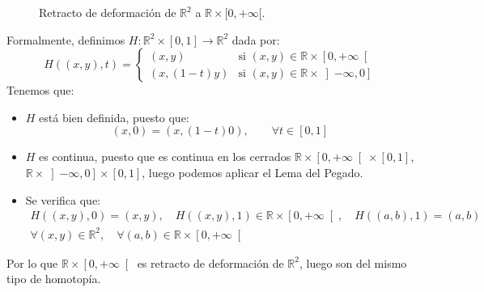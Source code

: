 \begin{ejercicio}
\begin{figure}[ht]
            \caption{Retracto de deformación de $\mathbb{R}^2$ a $\mathbb{R}\times [0,+\infty[$.}
            \label{fig:2.1.14}
        \end{figure}
        \noindent
        Formalmente, definimos $H:\mathbb{R}^2\times [0,1]\to \mathbb{R}^2$ dada por:
            \begin{equation*}
                H((x,y),t) = \left\{\begin{array}{ll}
                        (x,y) & \text{si\ } (x,y)\in \mathbb{R}\times \left[0,+\infty\right[ \\
                        (x, (1-t)y) & \text{si\ } (x,y)\in \mathbb{R}\times \left]-\infty, 0\right]
                \end{array}\right. 
            \end{equation*}
            Tenemos que:
            \begin{itemize}
                \item $H$ está bien definida, puesto que:
                    \begin{equation*}
                        (x,0) = (x,(1-t)0), \qquad \forall t\in [0,1]
                    \end{equation*}
                \item $H$ es continua, puesto que es continua en los cerrados $\mathbb{R}\times \left[0,+\infty\right[\times [0,1]$, $\mathbb{R}\times \left]-\infty,0\right]\times [0,1]$, luego podemos aplicar el Lema del Pegado.
                \item Se verifica que:
                    \begin{multline*}
                        H((x,y),0) = (x,y), \quad H((x,y),1) \in \mathbb{R}\times \left[0,+\infty\right[, \quad H((a,b),1) = (a,b) \\
                            \forall (x,y)\in \mathbb{R}^2, \quad \forall (a,b)\in \mathbb{R}\times \left[0,+\infty\right[
                    \end{multline*}
            \end{itemize}
            Por lo que $\mathbb{R}\times \left[0,+\infty\right[$ es retracto de deformación de $\mathbb{R}^2$, luego son del mismo tipo de homotopía.
\end{ejercicio}

